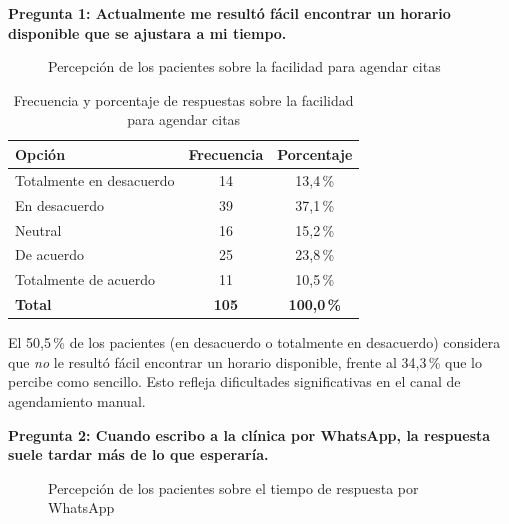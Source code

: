 \medskip
\textbf{Pregunta 1: Actualmente me resultó fácil encontrar un horario disponible que se ajustara a mi tiempo.}

\begin{figure}[H]
\centering
{}
\caption{Percepción de los pacientes sobre la facilidad para agendar citas}
\label{fig:p1_torta}
\end{figure}

\begin{table}[H]
\centering
\caption{Frecuencia y porcentaje de respuestas sobre la facilidad para agendar citas}
\label{tab:p1_frecuencia}
\fontsize{10}{12}\selectfont
\renewcommand{\arraystretch}{1.2}
\begin{tabular}{|l|c|c|}
\hline
\textbf{Opción} & \textbf{Frecuencia} & \textbf{Porcentaje} \\ \hline
Totalmente en desacuerdo & 14 & 13{,}4\,\% \\ \hline
En desacuerdo & 39 & 37{,}1\,\% \\ \hline
Neutral & 16 & 15{,}2\,\% \\ \hline
De acuerdo & 25 & 23{,}8\,\% \\ \hline
Totalmente de acuerdo & 11 & 10{,}5\,\% \\ \hline
\textbf{Total} & \textbf{105} & \textbf{100{,}0\,\%} \\ \hline
\end{tabular}
\end{table}

\smallskip
El 50{,}5\,\% de los pacientes (en desacuerdo o totalmente en desacuerdo) considera que
\emph{no} le resultó fácil encontrar un horario disponible, frente al 34{,}3\,\% que
lo percibe como sencillo. Esto refleja dificultades significativas en el canal de agendamiento manual.

\medskip
\textbf{Pregunta 2: Cuando escribo a la clínica por WhatsApp, la respuesta suele tardar más de lo que esperaría.}

\begin{figure}[H]
\centering
{}
\caption{Percepción de los pacientes sobre el tiempo de respuesta por WhatsApp}
\label{fig:p2_torta}
\end{figure}

